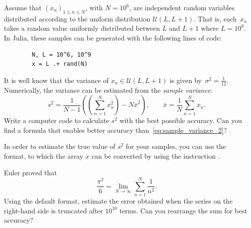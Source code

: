\begin{compexercise}
    Assume that $(x_n)_{1 \leq n \leq N}$, with $N = 10^6$, are independent random variables distributed according to
    the uniform distribution $\mathcal U(L, L+1)$.
    That is, each~$x_n$ takes a random value uniformly distributed between $L$ and $L+1$ where $L = 10^9$.
    In Julia, these samples can be generated with the following lines of code:
    \begin{verbatim}
        N, L = 10^6, 10^9
        x = L .+ rand(N)
    \end{verbatim}
    It is well know that the variance of $x_n \in \mathcal U(L, L+1)$ is given by~$\sigma^2 = \frac{1}{12}$.
    Numerically, the variance can be estimated from the \emph{sample variance}:
    \begin{equation}
        \label{eq:sample_variance_2}
        s^2 = \frac{1}{N-1} \left(\left(\sum_{n=1}^{N} x_n^2\right) - N \bar x^2 \right),
        \qquad \bar x = \frac{1}{N} \sum_{n=1}^{N} x_n.
    \end{equation}
    Write a computer code to calculate $s^2$ with the best possible accuracy.
    Can you find a formula that enables better accuracy than~\eqref{eq:sample_variance_2}?
\end{compexercise}

\begin{remark}
    In order to estimate the true value of $s^2$ for your samples,
    you can use the  format,
    to which the array $x$ can be converted by using the instruction .
\end{remark}

\begin{compexercise}
    Euler proved that
    \[
        \frac{\pi^2}{6} = \lim_{N \to \infty} \sum_{n=1}^{N} \frac{1}{n^2}.
    \]
    Using the default  format,
    estimate the error obtained when the series on the right-hand side is truncated after $10^{10}$ terms.
    Can you rearrange the sum for best accuracy?
\end{compexercise}

